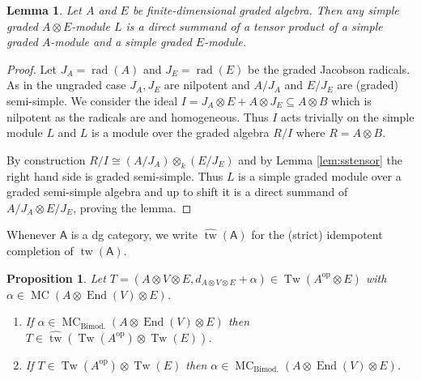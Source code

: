 \documentclass[a4paper]{amsart}
\theoremstyle{plain}
\newtheorem{prop}[thm]{Proposition}
\newtheorem{lem}[thm]{Lemma}
\theoremstyle{definition}
\theoremstyle{remark}
\DeclareMathOperator{\End}{End}
\DeclareMathOperator{\MC}{MC}
\DeclareMathOperator{\tw}{tw}
\DeclareMathOperator{\Tw}{Tw}
\newcommand{\op}{\mathrm{op}}
\newcommand{\cat}[1]{\mathsf{#1}}
\numberwithin{equation}{section}
\theoremstyle{plain}
\begin{document}
	\begin{lem}\label{lem:separablealgebras}
		Let $A$ and $E$ be finite-dimensional graded algebra. Then any simple graded $A\otimes E$-module $L$ is a direct summand of a tensor product of a simple graded $A$-module and a simple graded $E$-module.
	\end{lem}
	\begin{proof}
		Let $ J_A=\operatorname{rad}(A)$ and $J_E=\operatorname{rad}(E)$ be the graded Jacobson radicals. As in the ungraded case $J_A, J_E$ are nilpotent and $A/J_A$ and $E/J_E$ are (graded) semi-simple.
		We consider the ideal $I=J_A\otimes E+A\otimes J_E \subseteq A\otimes B $ which is nilpotent as the radicals are and homogeneous.  
		Thus $I$ acts trivially on the simple module $L$ and $L$ is a module over the graded algebra $R/I$ where $R = A\otimes B$.
		
	By construction $R/I \cong (A/J_A)\otimes_k(E/J_E)$ and by Lemma \ref{lem:sstensor} the right hand side is graded semi-simple.
		Thus $L$ is a simple graded module over a graded semi-simple algebra and up to shift it is a direct summand of $A/J_A \otimes E/J_E$, proving the lemma.
%		
%		
	\end{proof}
	Whenever $\cat{A}$ is a dg category, we write $\widehat{\tw}(\cat{A})$ for the (strict) idempotent completion of $\tw(\cat{A})$.
	\begin{prop}\label{simple twisted modules}
		Let $T=(A\otimes V\otimes E,d_{A\otimes V\otimes E}+\alpha)\in \Tw(A^\op\otimes E)$ with $\alpha\in \MC(A\otimes \End(V)\otimes E)$. 
		\begin{enumerate}
			\item[(1)] If $\alpha\in \MC_\text{Bimod.}(A\otimes \End(V)\otimes E)$ then $T\in \widehat{\tw}(\Tw(A^\op)\otimes \Tw(E))$.			\item[(2)]  If
			$T\in \Tw(A^\op)\otimes \Tw(E)$ then $\alpha\in \MC_\text{Bimod.}(A\otimes \End(V)\otimes E)$. 
		\end{enumerate}
	\end{prop}
\end{document}
